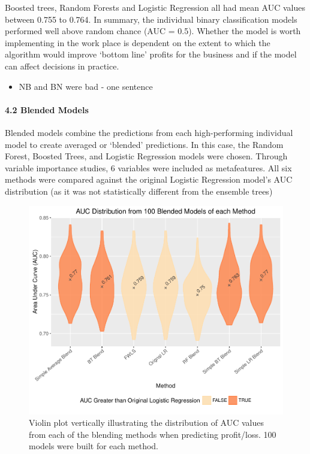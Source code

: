 \documentclass[]{elsarticle} %
\makeatletter
\providecommand{\tightlist}{%
  \setlength{\itemsep}{0pt}\setlength{\parskip}{0pt}}
\def\maxwidth{\ifdim\Gin@nat@width>\linewidth\linewidth
\else\Gin@nat@width\fi}
\let\Oldincludegraphics\includegraphics
\renewcommand{\includegraphics}[1]{\Oldincludegraphics[width=\maxwidth]{#1}}
\makeatother
\begin{document}
Boosted trees, Random Forests and Logistic Regression all had mean AUC
values between 0.755 to 0.764. In summary, the individual binary
classification models performed well above random chance (AUC = 0.5).
Whether the model is worth implementing in the work place is dependent
on the extent to which the algorithm would improve `bottom line' profits
for the business and if the model can affect decisions in practice.

\begin{itemize}
\tightlist
\item
  NB and BN were bad - one sentence
\end{itemize}

\paragraph{4.2 Blended Models}\label{blended-models}

Blended models combine the predictions from each high-performing
individual model to create averaged or `blended' predictions. In this
case, the Random Forest, Boosted Trees, and Logistic Regression models
were chosen. Through variable importance studies, 6 variables were
included as metafeatures. All six methods were compared against the
original Logistic Regression model's AUC distribution (as it was not
statistically different from the ensemble trees)

\begin{figure}[htbp]
\centering
\includegraphics{Consulting_Profitability_Paper_files/figure-latex/blend_violin-1.pdf}
\caption{Violin plot vertically illustrating the distribution of AUC
values from each of the blending methods when predicting profit/loss.
100 models were built for each method.}
\end{figure}
\end{document}
